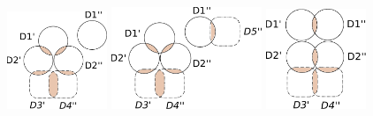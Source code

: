 \documentclass[11pt]{article}
\begin{document}
\begin{figure}[!htb]
%
    \centering
  \includegraphics[width=3cm]{CaseDifferentiation/CaseDifferentiation_2SameDim_5DimSomeDePairPartnered_5ChainingWith2ForeignDim2.pdf}
  \label{}
\endminipage
{}
    \centering
    \includegraphics[width=4.5cm]{CaseDifferentiation/CaseDifferentiation_2SameDim_5DimSomeDePairPartnered_5ChainingWith2ForeignDim.pdf}
  \label{}
\endminipage\hfill
{}%
    \centering
  \includegraphics[width=3cm]{CaseDifferentiation/CaseDifferentiation_2SameDim_4DimSomeDePairPartnered_4ChainingWith2ForeignDim.pdf}
  \label{}
\endminipage
\end{figure}
\end{document}
